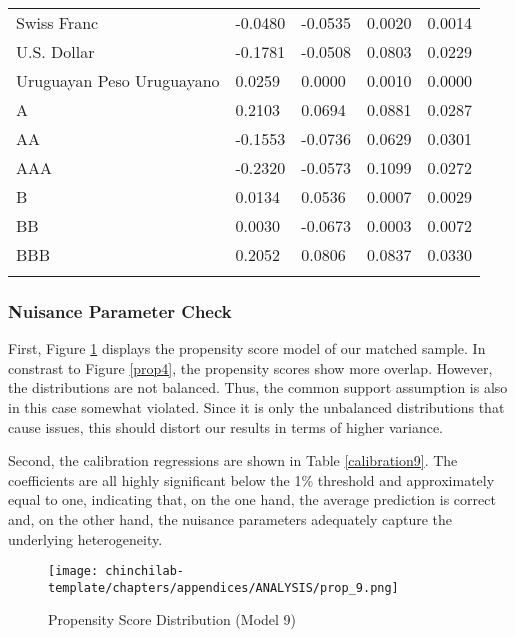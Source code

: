 \begin{table}[H]
\begin{tabular}{lllll}
Swiss Franc & -0.0480 & -0.0535 & 0.0020 & 0.0014 \\
U.S. Dollar & -0.1781 & -0.0508 & 0.0803 & 0.0229 \\
Uruguayan Peso Uruguayano & 0.0259 & 0.0000 & 0.0010 & 0.0000 \\
A & 0.2103 & 0.0694 & 0.0881 & 0.0287 \\
AA & -0.1553 & -0.0736 & 0.0629 & 0.0301 \\
AAA & -0.2320 & -0.0573 & 0.1099 & 0.0272 \\
B & 0.0134 & 0.0536 & 0.0007 & 0.0029 \\
BB & 0.0030 & -0.0673 & 0.0003 & 0.0072 \\
BBB & 0.2052 & 0.0806 & 0.0837 & 0.0330 \\
\hline \\[-1.8ex]
\end{tabular}
\end{table}

\newpage

\subsubsection*{Nuisance Parameter Check}

First, Figure \ref{prop9} displays the propensity score model of our matched sample. In constrast to Figure \ref{prop4}, the propensity scores show more overlap. However, the distributions are not balanced. Thus, the common support assumption is also in this case somewhat violated. Since it is only the unbalanced distributions that cause issues, this should distort our results in terms of higher variance.

Second, the calibration regressions are shown in Table \ref{calibration9}. The coefficients are all highly significant below the 1\% threshold and approximately equal to one, indicating that, on the one hand, the average prediction is correct and, on the other hand, the nuisance parameters adequately capture the underlying heterogeneity.

\begin{figure}[H]
    \centering
    \texttt{[image: chinchilab-template/chapters/appendices/ANALYSIS/prop\_9.png]}
    \caption{Propensity Score Distribution (Model 9)}
    \label{prop9}
\end{figure}

